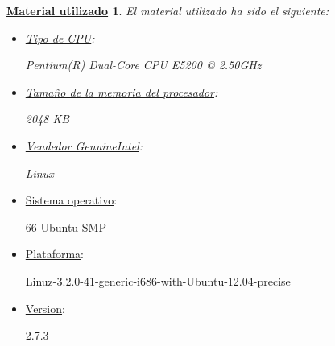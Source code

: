 \documentclass{beamer}
\newtheorem{descripcion de los experimentos}{\underline {Descripcion de los experimentos}}
\newtheorem{material}{\underline {Material utilizado}}
\begin{document}
\begin {frame}
\begin{material}
\pause
El material utilizado ha sido el siguiente:
\begin {itemize}
\item \underline{Tipo de CPU}: 

\begin {center}
 Pentium(R) Dual-Core CPU E5200 @ 2.50GHz 
\end {center}
\item \underline{Tamaño de la memoria del procesador}: 

\begin {center}
 2048 KB
\end {center}
\item \underline{Vendedor GenuineIntel}:

\begin {center}
Linux
\end {center}
\end {itemize}
\end {material}
\end {frame}
\begin{frame}
\begin {itemize}
\item \underline{Sistema operativo}:

\begin {center}
 66-Ubuntu SMP
\end {center}
\item \underline{Plataforma}:

\begin {center}
 Linuz-3.2.0-41-generic-i686-with-Ubuntu-12.04-precise
\end {center}
\item \underline{Version}:

\begin {center}
2.7.3
\end {center}
\end {itemize}
\end{frame}
\end{document}
